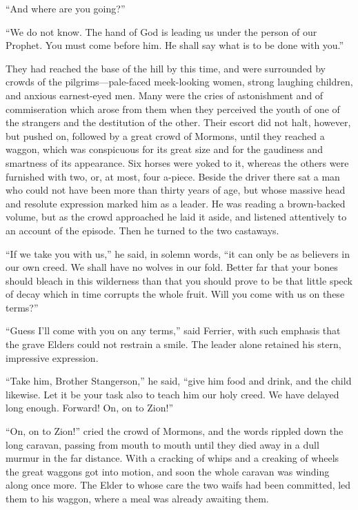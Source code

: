 \documentclass[12pt]{book}
\begin{document}
“And where are you going?” 

“We do not know. The hand of God is leading us under the person of our Prophet. You must come before him. He shall say what is to be done with you.” 

They had reached the base of the hill by this time, and were surrounded by crowds of the pilgrims—pale-faced meek-looking women, strong laughing children, and anxious earnest-eyed men. Many were the cries of astonishment and of commiseration which arose from them when they perceived the youth of one of the strangers and the destitution of the other. Their escort did not halt, however, but pushed on, followed by a great crowd of Mormons, until they reached a waggon, which was conspicuous for its great size and for the gaudiness and smartness of its appearance. Six horses were yoked to it, whereas the others were furnished with two, or, at most, four a-piece. Beside the driver there sat a man who could not have been more than thirty years of age, but whose massive head and resolute expression marked him as a leader. He was reading a brown-backed volume, but as the crowd approached he laid it aside, and listened attentively to an account of the episode. Then he turned to the two castaways. 

“If we take you with us,” he said, in solemn words, “it can only be as believers in our own creed. We shall have no wolves in our fold. Better far that your bones should bleach in this wilderness than that you should prove to be that little speck of decay which in time corrupts the whole fruit. Will you come with us on these terms?” 

“Guess I’ll come with you on any terms,” said Ferrier, with such emphasis that the grave Elders could not restrain a smile. The leader alone retained his stern, impressive expression. 

“Take him, Brother Stangerson,” he said, “give him food and drink, and the child likewise. Let it be your task also to teach him our holy creed. We have delayed long enough. Forward! On, on to Zion!” 

“On, on to Zion!” cried the crowd of Mormons, and the words rippled down the long caravan, passing from mouth to mouth until they died away in a dull murmur in the far distance. With a cracking of whips and a creaking of wheels the great waggons got into motion, and soon the whole caravan was winding along once more. The Elder to whose care the two waifs had been committed, led them to his waggon, where a meal was already awaiting them. 
\end{document}
